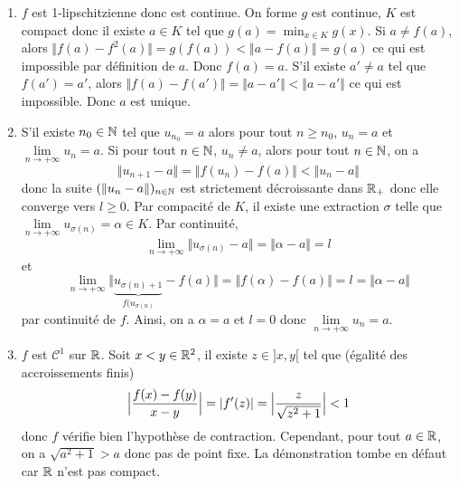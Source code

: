 \begin{solution}
	\phantom{}
	\begin{enumerate}
		\item $f$ est 1-lipschitzienne donc est continue. On forme 
		$g$ est continue, $K$ est compact donc il existe $a\in K$ tel que $g(a)=\min_{x\in K}g(x)$. Si $a\neq f(a)$, alors $\Vert f(a)-f^{2}(a)\Vert=g(f(a))<\Vert a-f(a)\Vert=g(a)$ ce qui est impossible par définition de $a$. Donc $f(a)=a$. S'il existe $a'\neq a$ tel que $f(a')=a'$, alors $\Vert f(a)-f(a')\Vert=\Vert a-a'\Vert<\Vert a-a'\Vert$ ce qui est impossible. Donc $a$ est unique.

		\item S'il existe $n_{0}\in\mathbb{N}$ tel que $u_{n_{0}}=a$ alors pour tout $n\geqslant n_{0}$, $u_{n}=a$ et $\lim\limits_{n\to+\infty}u_{n}=a$. Si pour tout $n\in\mathbb{N}$, $u_{n}\neq a$, alors pour tout $n\in\mathbb{N}$, on a
		$$\Vert u_{n+1}-a\Vert=\Vert f(u_{n})-f(a)\Vert<\Vert u_{n}-a\Vert$$
		donc la suite $(\Vert u_{n}-a\Vert)_{n\in\mathbb{N}}$ est strictement décroissante dans $\mathbb{R}_{+}$ donc elle converge vers $l\geqslant0$. Par compacité de $K$, il existe une extraction $\sigma$ telle que $\lim\limits_{n\to+\infty}u_{\sigma(n)}=\alpha\in K$. Par continuité, $$\lim\limits_{n\to+\infty}\Vert u_{\sigma(n)}-a\Vert=\Vert\alpha-a\Vert=l$$ 
		et
		$$\lim\limits_{n\to+\infty}\Vert \underbrace{u_{\sigma(n)+1}}_{f(u_{\sigma(n)}}-f(a)\Vert=\Vert f(\alpha)-f(a)\Vert=l=\Vert\alpha-a\Vert$$
		par continuité de $f$.
		Ainsi, on a $\alpha=a$ et $l=0$ donc $\lim\limits_{n\to+\infty}u_{n}=a$.

		\item $f$ est $\mathcal{C}^{1}$ sur $\mathbb{R}$. Soit $x<y\in\mathbb{R}^{2}$, il existe $z\in]x,y[$ tel que (égalité des accroissements finis)
		$$\Bigl\lvert\frac{f(x)-f(y)}{x-y}\Bigr\rvert=\vert f'(z)\vert=\Bigl\lvert\frac{z}{\sqrt{z^{2}+1}}\Bigr\rvert<1$$
		donc $f$ vérifie bien l'hypothèse de contraction. Cependant, pour tout $a\in\mathbb{R}$, on a $\sqrt{a^{2}+1}>a$ donc pas de point fixe. La démonstration tombe en défaut car $\mathbb{R}$ n'est pas compact.
	\end{enumerate}
\end{solution}


